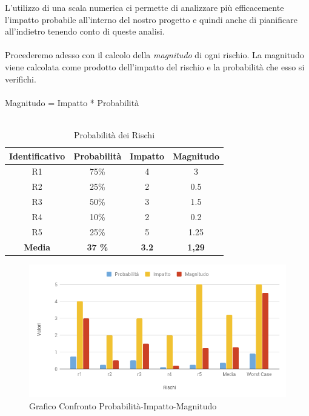 	L’utilizzo di una scala numerica ci permette di analizzare più efficacemente l’impatto probabile all’interno del nostro progetto e quindi anche di pianificare all’indietro tenendo conto di queste analisi. \\ \\ Procederemo adesso con il calcolo della \textit{magnitudo} di ogni rischio.
	La magnitudo viene calcolata come prodotto dell'impatto del rischio e la probabilità che esso si verifichi. \\ \\
	Magnitudo = Impatto * Probabilità \\ \\
	\begin{table}[!htpb]
		\centering
		\renewcommand{\arraystretch}{2} 
		\begin{tabular}{|c|c|c|c|}
		    \rowcolor{orange!50}
		    \hline
		    \textbf{Identificativo} & \textbf{Probabilità} & \textbf{Impatto} & \textbf{Magnitudo}\\
			\hline
			R1 & 75\% & 4 & 3 \\
			\hline
			R2 &  25\%  & 2  & 0.5 \\
			\hline
			R3  & 50\%  & 3  & 1.5 \\
			\hline
			R4  & 10\% &  2 &  0.2 \\
			\hline
			R5  & 25\%  & 5  & 1.25 \\
			\hline
			\textbf{Media}  & \textbf{37 \%}&  \textbf{3.2} &  \textbf{1,29}\\
			\hline
		\end{tabular}
		\caption{Probabilità dei Rischi}
	\end{table}
	\newline
	\begin{figure}
	    \centering
	    \includegraphics[scale=0.6]{elaborazione_manitudo.png} 
	    \caption{Grafico Confronto Probabilità-Impatto-Magnitudo}
	\end{figure}
